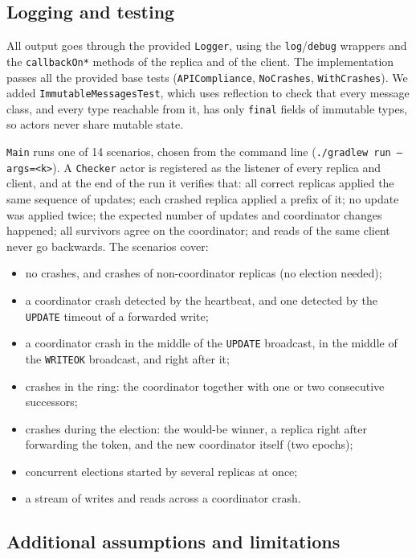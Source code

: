 \subsection{Logging and testing}

All output goes through the provided \texttt{Logger}, using the \texttt{log}/\texttt{debug} wrappers and the \texttt{callbackOn*} methods of the replica and of the client. The implementation passes all the provided base tests (\texttt{APICompliance}, \texttt{NoCrashes}, \texttt{WithCrashes}). We added \texttt{ImmutableMessagesTest}, which uses reflection to check that every message class, and every type reachable from it, has only \texttt{final} fields of immutable types, so actors never share mutable state.

\texttt{Main} runs one of 14 scenarios, chosen from the command line (\texttt{./gradlew run --args=<k>}). A \texttt{Checker} actor is registered as the listener of every replica and client, and at the end of the run it verifies that: all correct replicas applied the same sequence of updates; each crashed replica applied a prefix of it; no update was applied twice; the expected number of updates and coordinator changes happened; all survivors agree on the coordinator; and reads of the same client never go backwards. The scenarios cover:

\begin{itemize}[nosep]
    \item no crashes, and crashes of non-coordinator replicas (no election needed);
    \item a coordinator crash detected by the heartbeat, and one detected by the \texttt{UPDATE} timeout of a forwarded write;
    \item a coordinator crash in the middle of the \texttt{UPDATE} broadcast, in the middle of the \texttt{WRITEOK} broadcast, and right after it;
    \item crashes in the ring: the coordinator together with one or two consecutive successors;
    \item crashes during the election: the would-be winner, a replica right after forwarding the token, and the new coordinator itself (two epochs);
    \item concurrent elections started by several replicas at once;
    \item a stream of writes and reads across a coordinator crash.
\end{itemize}

\subsection{Additional assumptions and limitations}


